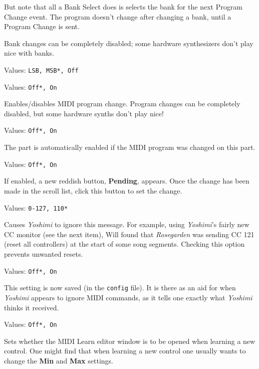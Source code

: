    But note that all a Bank Select does is selects the bank for the next
   Program Change event.  The program doesn't change after changing a bank,
   until a Program Change is sent.

   Bank changes can be completely disabled; some hardware
   synthesizers don't play nice with banks.

   Values: \texttt{LSB, MSB*, Off}


   Values: \texttt{Off*, On}

   Enables/disables MIDI program change.
   Program changes can be completely disabled, but some hardware synths don't
   play nice!


   Values: \texttt{Off*, On}

   The part is automatically enabled if the MIDI program was changed on this
   part.


   Values: \texttt{Off*, On}

   If enabled, a new reddish button, \textbf{Pending}, appears.
   Once the change has been made in the scroll list, click this button
   to set the change.

   Values: \texttt{0-127, 110*}

   Causes \textsl{Yoshimi} to ignore this message.
   For example, using \textsl{Yoshimi}'s fairly new CC monitor (see the next
   item), Will found that \textsl{Rosegarden} was sending CC 121 (reset all
   controllers) at the start of some song segments.  Checking this option
   prevents unwanted resets.

   Values: \texttt{Off*, On}

   This setting is now saved (in the \texttt{config} file). It is there
   as an aid for when \textsl{Yoshimi} appears to ignore MIDI commands,
   as it tells one exactly what \textsl{Yoshimi} thinks it received.

   Values: \texttt{Off*, On}

   Sets whether the MIDI Learn editor window is to be opened when learning a
   new control. One might find that when learning a new control one
   usually wants to change the \textbf{Min} and \textbf{Max} settings.

